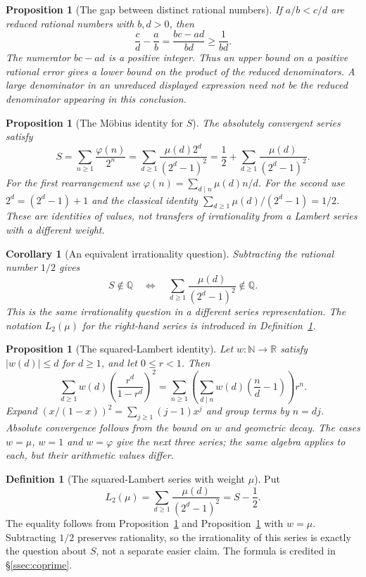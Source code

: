 \documentclass[11pt]{article}
\theoremstyle{plain}
\newtheorem{prop}[thm]{Proposition}
\newtheorem{cor}[thm]{Corollary}
\theoremstyle{definition}
\newtheorem{defn}[thm]{Definition}
\theoremstyle{remark}
\newcommand{\lean}[2]{\leanlink{#2}}
\begin{document}
\begin{prop}[The gap between distinct rational numbers]\label{catalogue:cert:d9}
If $a/b<c/d$ are reduced rational numbers with $b,d>0$, then
\[
 \frac cd-\frac ab=\frac{bc-ad}{bd}\ge\frac1{bd}.
\]
The numerator $bc-ad$ is a positive integer. Thus an upper bound on a
positive rational error gives a lower bound on the product of the reduced
denominators. A large denominator in an unreduced displayed expression
need not be the reduced denominator appearing in this conclusion.
\end{prop}

\begin{prop}[The M\"obius identity for $S$]\label{catalogue:mob:a1a}
The absolutely convergent series satisfy
\[
 S=\sum_{n\ge1}\frac{\varphi(n)}{2^n}
  =\sum_{d\ge1}\frac{\mu(d)2^d}{(2^d-1)^2}
  =\frac12+\sum_{d\ge1}\frac{\mu(d)}{(2^d-1)^2}.
\]
For the first rearrangement use
$\varphi(n)=\sum_{d\mid n}\mu(d)n/d$. For the second use
$2^d=(2^d-1)+1$ and the classical identity
$\sum_{d\ge1}\mu(d)/(2^d-1)=1/2$.
These are identities of values, not transfers of irrationality from a
Lambert series with a different weight.
\end{prop}

\begin{cor}[An equivalent irrationality question]\label{catalogue:mob:a1b}
Subtracting the rational number $1/2$ gives
\[
 S\notin\mathbb Q
 \quad\Longleftrightarrow\quad
 \sum_{d\ge1}\frac{\mu(d)}{(2^d-1)^2}\notin\mathbb Q.
\]
This is the same irrationality question in a different series
representation. The notation $L_2(\mu)$ for the right-hand series is
introduced in Definition~\ref{catalogue:mob:a3}.
\end{cor}

\begin{prop}[The squared-Lambert identity]\label{catalogue:mob:a2}
Let $w:\mathbb N\to\mathbb R$ satisfy $|w(d)|\le d$ for $d\ge1$,
and let $0\le r<1$. Then
\[
 \sum_{d\ge1}w(d)\left(\frac{r^d}{1-r^d}\right)^2
 =\sum_{n\ge1}\left(\sum_{d\mid n}w(d)\left(\frac nd-1\right)\right)r^n.
\]
Expand $(x/(1-x))^2=\sum_{j\ge1}(j-1)x^j$ and group terms by
$n=dj$. Absolute convergence follows from the bound on $w$ and
geometric decay. The cases $w=\mu$, $w=1$ and $w=\varphi$ give the next
three series; the same algebra applies to each, but their arithmetic
values differ.
\end{prop}

\begin{defn}[The squared-Lambert series with weight $\mu$]\label{catalogue:mob:a3}
Put
\[
 L_2(\mu)=\sum_{d\ge1}\frac{\mu(d)}{(2^d-1)^2}=S-\frac12.
\]
The equality follows from Proposition~\ref{catalogue:mob:a1a} and
Proposition~\ref{catalogue:mob:a2} with $w=\mu$.
Subtracting $1/2$ preserves rationality, so the irrationality of this
series is exactly the question about $S$, not a separate easier claim.
The formula is credited in \S\ref{ssec:coprime}.
\lean{tsum\_totient\_half\_pow\_eq\_half\_add\_moebius\_sq}{MersenneLambertLadder.lean:665}
\end{defn}
\end{document}
